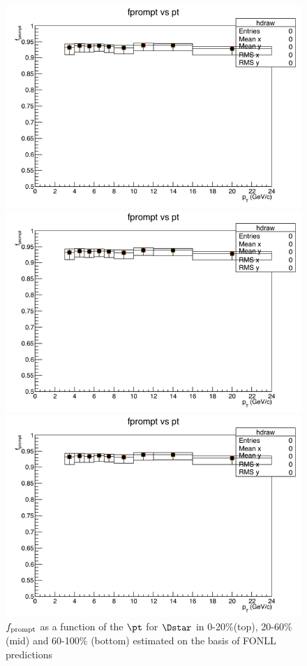 \begin{figure}
\centering
\includegraphics[width=0.6\linewidth]{figuresVsCent/Dstar/EffAndFeed/fPrompt_020.png}

\includegraphics[width=0.6\linewidth]{figuresVsCent/Dstar/EffAndFeed/fPrompt_2060.png}

\includegraphics[width=0.6\linewidth]{figuresVsCent/Dstar/EffAndFeed/fPrompt_60100.png}
\caption{$f_{\rm prompt}$ as a function of the $\pt$ for $\Dstar$ in 0-20$\%$(top), 20-60$\%$ (mid) and 60-100$\%$ (bottom) estimated on the basis of FONLL predictions}
\label{fpromptDstar}
\end{figure}



